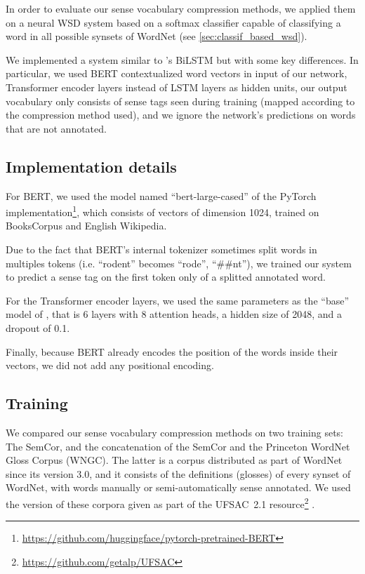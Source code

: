\documentclass[11pt]{article}
\newcommand{\citep}[1]{\cite{#1}}
\newcommand{\citet}[1]{\newcite{#1}}
\begin{document}
\fi

In order to evaluate our sense vocabulary compression methods, we applied them on a neural WSD system 
based on a softmax classifier capable of classifying a word in all possible synsets of WordNet (see \autoref{sec:classif_based_wsd}).

We implemented a system 
similar to \citet{raganato2017}'s BiLSTM but with some key differences. In particular, 
we used BERT contextualized word vectors \citep{devlin2018bert} in input of our network,
Transformer encoder 
layers 
\citep{vaswani2017} instead of LSTM 
layers 
as hidden units, 
our output vocabulary only consists of sense tags seen during training (mapped according to the compression method used), 
and we ignore the network's predictions on words that are not annotated.



\subsection{Implementation details}

For BERT, we used the model named ``bert-large-cased'' of the PyTorch implementation\footnote{\url{https://github.com/huggingface/pytorch-pretrained-BERT}}, which consists of vectors of dimension 1024, trained on BooksCorpus and English Wikipedia.

Due to the fact that BERT's internal tokenizer sometimes split words in multiples tokens (i.e. \lbrack{}``rodent''\rbrack{} becomes \lbrack{}``rode'', ``\#\#nt''\rbrack{}), we trained our system to predict a sense tag on the first token only of a splitted annotated word.

For the Transformer encoder layers, we used the same parameters as the ``base'' model of \citet{vaswani2017}, that is 6 layers with 8 attention heads, a hidden size of 2048, and a dropout of 0.1.

Finally, because BERT already encodes the position of the words inside their vectors, we did not add any positional encoding.



\subsection{Training}

We compared our sense vocabulary compression methods on two training sets: 
The SemCor, and  
the concatenation of the SemCor and the Princeton WordNet Gloss Corpus (WNGC).
The latter is a corpus distributed as part of WordNet since its version 3.0, and it consists of the definitions (glosses) of every synset of WordNet, with 
words manually or semi-automatically sense annotated.
We used the version of these corpora given as part of the UFSAC~2.1 resource\footnote{\url{https://github.com/getalp/UFSAC}} 
\citep{vialhal01718237}.
\end{document}
